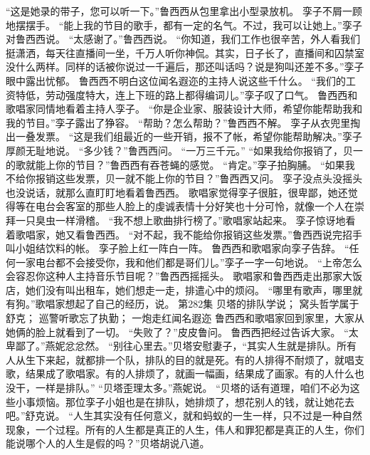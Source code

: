 \documentclass[a4paper,12pt,UTF8,twoside]{ctexbook}
\begin{document}
        “这是她录的带子，您可以听一下。”鲁西西从包里拿出小型录放机。  
        孪子不屑一顾地摆摆手。  
        “能上我的节目的歌手，都有一定的名气。不过，我可以让她上。”孪子对鲁西西说。  
        “太感谢了。”鲁西西说。  
        “你知道，我们工作也很辛苦，外人看我们挺潇洒，每天往直播间一坐，千万人听你神侃。其实，日子长了，直播间和囚禁室没什么两样。同样的话被你说过一千遍后，那还叫话吗？说是狗叫还差不多。”孪子眼中露出忧郁。  
        鲁西西不明白这位闻名遐迩的主持人说这些千什么。  
        “我们的工资特低，劳动强度特大，连上下班的路上都得编词儿。”孪子叹了口气。  
        鲁西西和歌唱家同情地看着主持人孪子。  
        “你是企业家、服装设计大师，希望你能帮助我和我的节目。”孪子露出了狰容。  
        “帮助？怎么帮助？”鲁西西不解。  
        孪子从衣兜里掏出一叠发票。  
        “这是我们组最近的一些开销，报不了帐，希望你能帮助解决。”孪子厚颜无耻地说。  
        “多少钱？”鲁西西问。  
        “一万三千元。”  
        “如果我给你报销了，贝一的歌就能上你的节目？”鲁西西有吞苍蝇的感觉。  
        “肯定。”孪子拍胸脯。  
        “如果我不给你报销这些发票，贝一就不能上你的节目？”鲁西西又问。  
        孪子没点头没摇头也没说话，就那么直盯盯地看着鲁西西。  
        歌唱家觉得孪子很脏，很卑鄙，她还觉得等在电台会客室的那些人脸上的虔诚表情十分好笑也十分可怜，就像一个人在崇拜一只臭虫一样滑稽。  
        “我不想上歌曲排行榜了。”歌唱家站起来。  
        孪子惊讶地看着歌唱家，她又看鲁西西。  
        “对不起，我不能给你报销这些发票。”鲁西西说完招手叫小姐结饮料的帐。  
        孪子脸上红一阵白一阵。  
        鲁西西和歌唱家向孪子告辞。  
        “任何一家电台都不会接受你，我和他们都是哥们儿。”孪子一字一句地说。  
        “上帝怎么会容忍你这种人主持音乐节目呢？”鲁西西摇摇头。  
        歌唱家和鲁西西走出那家大饭店，她们没有叫出租车，她们想走一走，排遣心中的烦闷。  
        “哪里有歌声，哪里就有狗。”歌唱家想起了自己的经历，说。          第282集  
        贝塔的排队学说；  
        窝头哲学属于舒克；  
        巡警听歌忘了执勤；  
        一炮走红闻名遐迩    
        鲁西西和歌唱家回到家里，大家从她俩的脸上就看到了一切。  
        “失败了？”皮皮鲁问。  
        鲁西西把经过告诉大家。  
        “太卑鄙了。”燕妮忿忿然。  
        “别往心里去。”贝塔安慰妻子，“其实人生就是排队。所有人从生下来起，就都排一个队，排队的目的就是死。有的人排得不耐烦了，就唱支歌，结果成了歌唱家。有的人排烦了，就画一幅画，结果成了画家。有的人什么也没干，一样是排队。”  
        “贝塔歪理太多。”燕妮说。        
        “贝塔的话有道理，咱们不必为这些小事烦恼。那位孪子小姐也是在排队，她排烦了，想花别人的钱，就让她花去吧。”舒克说。  
        “人生其实没有任何意义，就和蚂蚁的一生一样，只不过是一种自然现象，一个过程。所有的人生都是真正的人生，伟人和罪犯都是真正的人生，你们能说哪个人的人生是假的吗？”贝塔胡说八道。  
\end{document}

